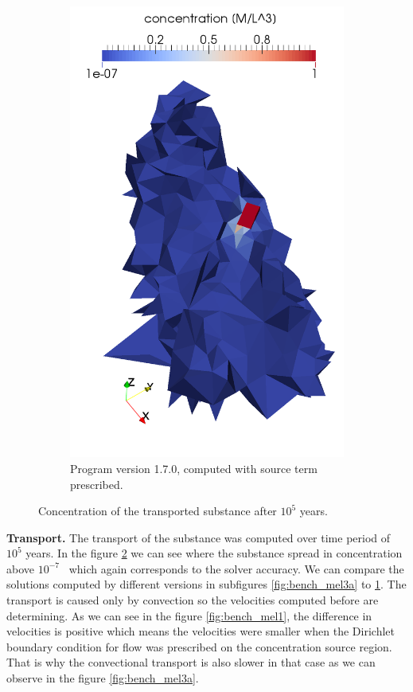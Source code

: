 \begin{figure}[!h]
\begin{subfigure}[b]{0.3\textwidth}
        \includegraphics[width=\textwidth]{tests_graphics/transport_end_170.pdf}
        \caption{Program version 1.7.0, computed with source term prescribed.}
        \label{fig:bench_mel3c}
    \end{subfigure}
    \caption{Concentration of the transported substance after $10^5$ years.}
    \label{fig:bench_mel3}
\end{figure}

\textbf{Transport.}
The transport of the substance was computed over time period of $10^5$ years. In the figure \ref{fig:bench_mel3} we can see 
where the substance spread in concentration above $10^{-7}$~ which again corresponds to the solver accuracy.
We can compare the solutions computed by different versions in subfigures \ref{fig:bench_mel3a} to \ref{fig:bench_mel3c}.
The transport is caused only by convection so the velocities computed before are determining. As we can see in the figure 
\ref{fig:bench_mel1}, the difference in velocities is positive which means the velocities were smaller when the Dirichlet 
boundary condition for flow was prescribed on the concentration source region. That is why the convectional transport is 
also slower in that case as we can observe in the figure \ref{fig:bench_mel3a}. 

